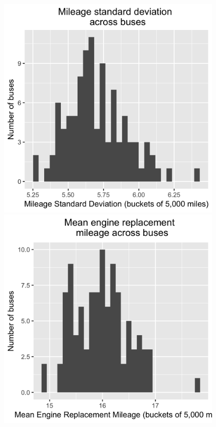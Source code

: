 \documentclass[paper=a4, fontsize=11pt]{scrartcl} %
\numberwithin{equation}{section} %
\numberwithin{figure}{section} %
\numberwithin{table}{section} %
\begin{document}
\begin{itemize}
\begin{itemize}
\begin{figure}
\begin{minipage}[b]{.48\linewidth}
	\end{minipage}
	\begin{minipage}[b]{.48\linewidth}
	\includegraphics[scale=.15]{sd_mileage_plot.png}
	\end{minipage}
	\begin{minipage}[b]{.48\linewidth}
	\includegraphics[scale=.15]{time_to_engine_replacement_plot.png}

\end{minipage}
\end{figure}
\end{itemize}
\end{itemize}
\end{document}

